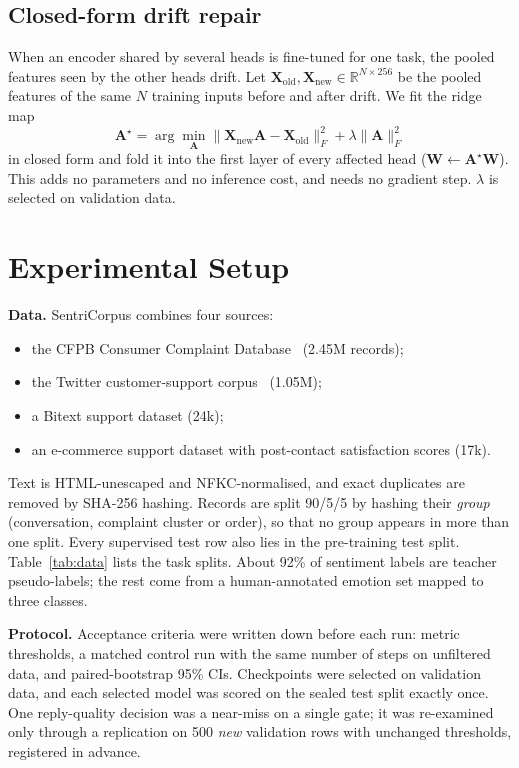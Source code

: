 \documentclass[conference]{IEEEtran}
\begin{document}
\subsection{Closed-form drift repair}
When an encoder shared by several heads is fine-tuned for one task, the pooled features seen by the other heads drift. Let $\mathbf{X}_{\text{old}},\mathbf{X}_{\text{new}}\in\mathbb{R}^{N\times256}$ be the pooled features of the same $N$ training inputs before and after drift. We fit the ridge map
\begin{equation}
\mathbf{A}^{\star}=\arg\min_{\mathbf{A}}\lVert \mathbf{X}_{\text{new}}\mathbf{A}-\mathbf{X}_{\text{old}}\rVert_F^2+\lambda\lVert\mathbf{A}\rVert_F^2
\end{equation}
in closed form and fold it into the first layer of every affected head ($\mathbf{W}\leftarrow\mathbf{A}^{\star}\mathbf{W}$). This adds no parameters and no inference cost, and needs no gradient step. $\lambda$ is selected on validation data.


\FloatBarrier
\section{Experimental Setup}
\textbf{Data.} SentriCorpus combines four sources:
\begin{itemize}
\item the CFPB Consumer Complaint Database~\cite{cfpbcomplaints} (2.45M records);
\item the Twitter customer-support corpus~\cite{twcs2017dataset} (1.05M);
\item a Bitext support dataset (24k);
\item an e-commerce support dataset with post-contact satisfaction scores (17k).
\end{itemize}
Text is HTML-unescaped and NFKC-normalised, and exact duplicates are removed by SHA-256 hashing. Records are split 90/5/5 by hashing their \emph{group} (conversation, complaint cluster or order), so that no group appears in more than one split. Every supervised test row also lies in the pre-training test split. Table~\ref{tab:data} lists the task splits. About 92\% of sentiment labels are teacher pseudo-labels; the rest come from a human-annotated emotion set mapped to three classes.



\textbf{Protocol.} Acceptance criteria were written down before each run: metric thresholds, a matched control run with the same number of steps on unfiltered data, and paired-bootstrap 95\% CIs. Checkpoints were selected on validation data, and each selected model was scored on the sealed test split exactly once. One reply-quality decision was a near-miss on a single gate; it was re-examined only through a replication on 500 \emph{new} validation rows with unchanged thresholds, registered in advance.
\end{document}
